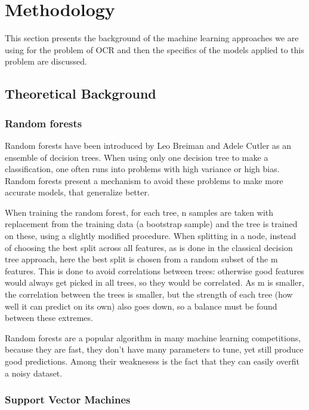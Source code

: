 \section{Methodology}
\label{sec:method}
This section presents the background of the machine learning approaches we are using for the problem of OCR and then the specifics of the models applied to this problem are discussed. 

\subsection{Theoretical Background}

\subsubsection{Random forests}

Random forests have been introduced by Leo Breiman and Adele Cutler\cite{breiman2001random} as an ensemble of decision trees. When using only one decision tree to make a classification, one often runs into problems with high variance or high bias. Random forests present a mechanism to avoid these problems to make more accurate models, that generalize better. 

When training the random forest, for each tree, n samples are taken with replacement from the training data (a bootstrap sample) and the tree is trained on these, using a slightly modified procedure. When splitting in a node, instead of choosing the best split across all features, as is done in the classical decision tree approach, here the best split is chosen from a random subset of the m features. This is done to avoid correlations between trees: otherwise good features would always get picked in all trees, so they would be correlated. As m is smaller, the correlation between the trees is smaller, but the strength of each tree (how well it can predict on its own) also goes down, so a balance must be found between these extremes. 

Random forests are a popular algorithm in many machine learning competitions, because they are fast, they don't have many parameters to tune, yet still produce good predictions. Among their weaknesess is the fact that they can easily overfit a noisy dataset. 

\subsubsection{Support Vector Machines}

